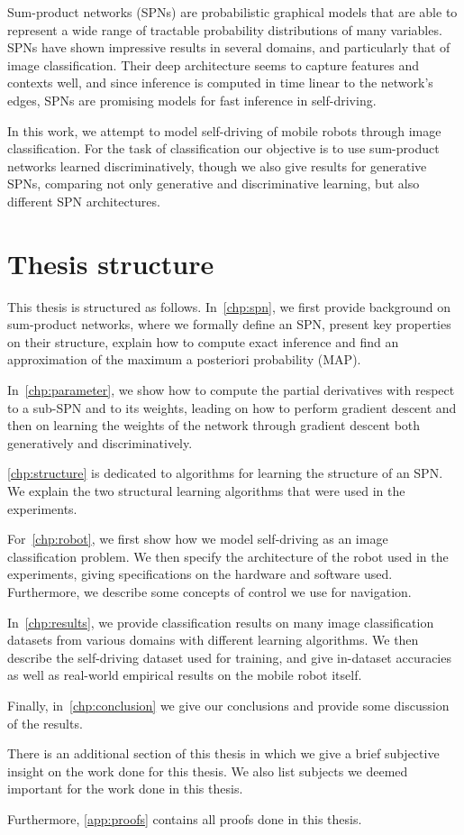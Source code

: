 Sum-product networks (SPNs) are probabilistic graphical models that are able to represent a wide
range of tractable probability distributions of many variables. SPNs have shown impressive results
in several domains, and particularly that of image classification. Their deep architecture seems to
capture features and contexts well, and since inference is computed in time linear to the network's
edges, SPNs are promising models for fast inference in self-driving.

In this work, we attempt to model self-driving of mobile robots through image classification. For
the task of classification our objective is to use sum-product networks learned discriminatively,
though we also give results for generative SPNs, comparing not only generative and discriminative
learning, but also different SPN architectures.

\section{Thesis structure}

This thesis is structured as follows. In~\autoref{chp:spn}, we first provide background on
sum-product networks, where we formally define an SPN, present key properties on their structure,
explain how to compute exact inference and find an approximation of the maximum a posteriori
probability (MAP).

In~\autoref{chp:parameter}, we show how to compute the partial derivatives with respect to a
sub-SPN and to its weights, leading on how to perform gradient descent and then on learning the
weights of the network through gradient descent both generatively and discriminatively.

\autoref{chp:structure} is dedicated to algorithms for learning the structure of an SPN\@. We
explain the two structural learning algorithms that were used in the experiments.

For~\autoref{chp:robot}, we first show how we model self-driving as an image classification
problem. We then specify the architecture of the robot used in the experiments, giving
specifications on the hardware and software used. Furthermore, we describe some concepts of control
we use for navigation.

In~\autoref{chp:results}, we provide classification results on many image classification datasets
from various domains with different learning algorithms. We then describe the self-driving dataset
used for training, and give in-dataset accuracies as well as real-world empirical results on the
mobile robot itself.

Finally, in~\autoref{chp:conclusion} we give our conclusions and provide some discussion of the
results.

There is an additional section of this thesis in which we give a brief subjective insight on the
work done for this thesis. We also list subjects we deemed important for the work done in this
thesis.

Furthermore, \autoref{app:proofs} contains all proofs done in this thesis.

